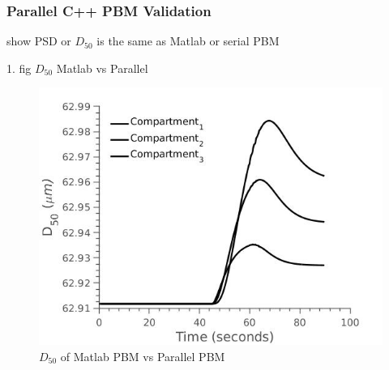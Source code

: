\documentclass[preprint,11pt,authoryear]{elsarticle}
\begin{document}
    \subsubsection{Parallel C++ PBM Validation}
   \par show PSD or $D_50$ is the same as Matlab or serial PBM
   \par 1. fig $D_50$ Matlab vs Parallel
      \begin{figure}[!htb]
      \centering
      \includegraphics[scale=0.5]{rslts_pbm_d_50_pll_vldtn}
      \caption{ $D_{50}$ of Matlab PBM vs Parallel PBM}
      \label{fig:rslts_pbm_d_50_vldtn}
      \end{figure}
    
\end{document}
